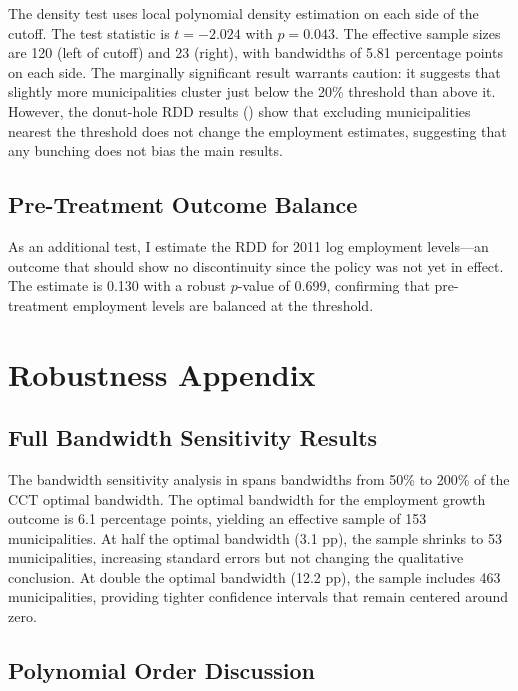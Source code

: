 \documentclass[12pt]{article}
\begin{document}
The \citet{cattaneo2020} density test uses local polynomial density estimation on each side of the cutoff. The test statistic is $t = -2.024$ with $p = 0.043$. The effective sample sizes are 120 (left of cutoff) and 23 (right), with bandwidths of 5.81 percentage points on each side. The marginally significant result warrants caution: it suggests that slightly more municipalities cluster just below the 20\% threshold than above it. However, the donut-hole RDD results () show that excluding municipalities nearest the threshold does not change the employment estimates, suggesting that any bunching does not bias the main results.

\subsection{Pre-Treatment Outcome Balance}

As an additional test, I estimate the RDD for 2011 log employment levels---an outcome that should show no discontinuity since the policy was not yet in effect. The estimate is 0.130 with a robust $p$-value of 0.699, confirming that pre-treatment employment levels are balanced at the threshold.

\section{Robustness Appendix}\label{app:robustness}

\subsection{Full Bandwidth Sensitivity Results}

The bandwidth sensitivity analysis in  spans bandwidths from 50\% to 200\% of the CCT optimal bandwidth. The optimal bandwidth for the employment growth outcome is 6.1 percentage points, yielding an effective sample of 153 municipalities. At half the optimal bandwidth (3.1 pp), the sample shrinks to 53 municipalities, increasing standard errors but not changing the qualitative conclusion. At double the optimal bandwidth (12.2 pp), the sample includes 463 municipalities, providing tighter confidence intervals that remain centered around zero.

\subsection{Polynomial Order Discussion}
\end{document}
